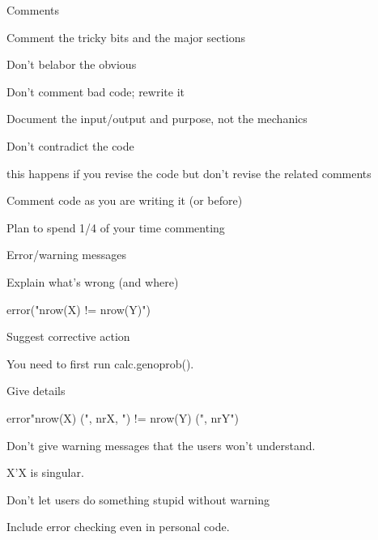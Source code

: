 \documentclass[12pt,t]{beamer}
\begin{document}
\begin{frame}{Comments}

\bi
\item Comment the tricky bits and the major sections
\item Don't belabor the obvious
\item Don't comment bad code; rewrite it
\item Document the input/output and purpose, not the mechanics
\item Don't contradict the code
  \bi
  \item this happens if you revise the code but don't revise the
    related comments
  \ei
\item Comment code as you are writing it (or before)
\item Plan to spend 1/4 of your time commenting
\ei


\end{frame}




\begin{frame}{Error/warning messages}

\vspace{6pt}

{\small
\bi
\item Explain what's wrong (and where)
  \bi
  \item {\ttsm error("nrow(X) != nrow(Y)")}
  \ei

\item Suggest corrective action
  \bi
  \item {\ttsm You need to first run calc.genoprob().}
  \ei

\item Give details
  \bi
  \item {\ttfn error"nrow(X) (", nrX, ") != nrow(Y) (", nrY")}
  \ei


\item Don't give warning messages that the users won't understand.
  \bi
  \item {\ttsm X'X is singular.}
  \ei

\item Don't let users do something stupid without warning

\item Include error checking even in personal code.
\ei
}

\end{frame}
\end{document}
